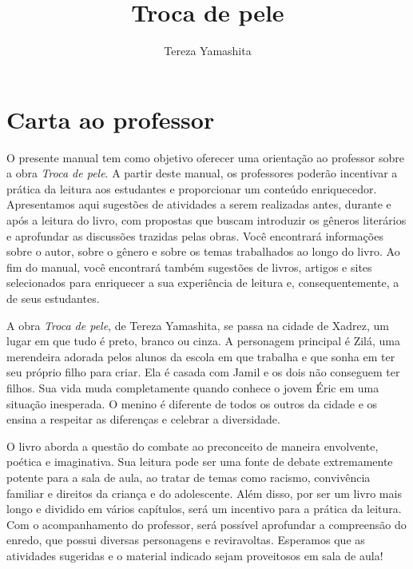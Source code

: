 \documentclass[11pt]{extarticle}
\newcommand{\AutorLivro}{Tereza Yamashita}
\newcommand{\TituloLivro}{Troca de pele}
\newcommand{\colaborador}{Ana Lancman}
\begin{document}
\title{\TituloLivro}
\author{\AutorLivro}
\def\authornotes{\colaborador}

\date{}
\maketitle

\tableofcontents

\section{Carta ao professor}

O presente manual tem como objetivo oferecer uma orientação ao professor sobre a obra \textit{Troca de pele}. A partir deste manual, os professores poderão incentivar a prática da leitura aos estudantes e proporcionar um conteúdo enriquecedor. Apresentamos aqui sugestões de atividades a serem realizadas antes, durante e após a leitura do livro, com propostas que buscam introduzir os gêneros literários e aprofundar as discussões trazidas pelas obras. Você encontrará informações sobre o autor, sobre o gênero e sobre os temas trabalhados ao longo do livro. Ao fim do manual, você encontrará também sugestões de livros, artigos e sites selecionados para enriquecer a sua experiência de leitura e, consequentemente, a de seus estudantes.

A obra \textit{Troca de pele}, de Tereza Yamashita, se passa na cidade de Xadrez, um lugar em que tudo é preto, branco ou cinza. A personagem principal é Zilá, uma merendeira adorada pelos alunos da escola em que trabalha e que sonha em ter seu próprio filho para criar. Ela é casada com Jamil e os dois não conseguem ter filhos. Sua vida muda completamente quando conhece o jovem Éric em uma situação inesperada. O menino é diferente de todos os outros da cidade e os ensina a respeitar as diferenças e celebrar a diversidade.

O livro aborda a questão do combate ao preconceito de maneira envolvente, poética e imaginativa. Sua leitura pode ser uma fonte de debate extremamente potente para a sala de aula, ao tratar de temas como racismo, convivência familiar e direitos da criança e do adolescente. Além disso, por ser um livro mais longo e dividido em vários capítulos, será um incentivo para a prática da leitura. Com o acompanhamento do professor, será possível aprofundar a compreensão do enredo, que possui diversas personagens e reviravoltas. Esperamos que as atividades sugeridas e o material indicado sejam proveitosos em sala de aula! 
\end{document}
